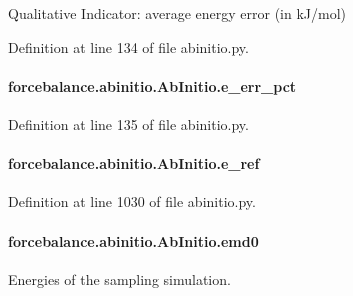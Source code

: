 Qualitative Indicator\-: average energy error (in k\-J/mol) 



Definition at line 134 of file abinitio.\-py.

\hypertarget{classforcebalance_1_1abinitio_1_1AbInitio_a4e3e525a03ab55bc004ebf0e3a0d60ce}{
\paragraph[{e\-\_\-err\-\_\-pct}]{\setlength{\rightskip}{0pt plus 5cm}forcebalance.\-abinitio.\-Ab\-Initio.\-e\-\_\-err\-\_\-pct}}\label{classforcebalance_1_1abinitio_1_1AbInitio_a4e3e525a03ab55bc004ebf0e3a0d60ce}


Definition at line 135 of file abinitio.\-py.

\hypertarget{classforcebalance_1_1abinitio_1_1AbInitio_a71d13d3fabd98146c68bb5fc784f6732}{
\paragraph[{e\-\_\-ref}]{\setlength{\rightskip}{0pt plus 5cm}forcebalance.\-abinitio.\-Ab\-Initio.\-e\-\_\-ref}}\label{classforcebalance_1_1abinitio_1_1AbInitio_a71d13d3fabd98146c68bb5fc784f6732}


Definition at line 1030 of file abinitio.\-py.

\hypertarget{classforcebalance_1_1abinitio_1_1AbInitio_af928d333d14cb3b93f7db78530455873}{
\paragraph[{emd0}]{\setlength{\rightskip}{0pt plus 5cm}forcebalance.\-abinitio.\-Ab\-Initio.\-emd0}}\label{classforcebalance_1_1abinitio_1_1AbInitio_af928d333d14cb3b93f7db78530455873}


Energies of the sampling simulation. 



